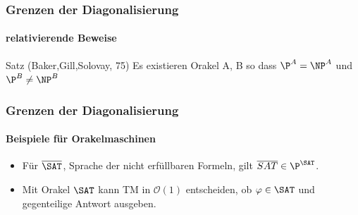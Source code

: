 \begin{frame}
	\frametitle{Grenzen der Diagonalisierung}
	\framesubtitle{relativierende Beweise}
	\begin{KITinfoblock}{Satz (Baker,Gill,Solovay, 75)}
		Es existieren Orakel A, B so dass ${\P}^A = {\NP}^A$ und ${\P}^B \neq {\NP}^B$
	\end{KITinfoblock}
	\bigskip
	\begin{overprint}
		
	\end{overprint}
\end{frame}

\begin{frame}
	\frametitle{Grenzen der Diagonalisierung}
	\framesubtitle{Beispiele für Orakelmaschinen}
	\heading{$\overline{\SAT}$}
	\begin{itemize}[<+->]
		\item   Für $\overline{\SAT}$, Sprache der nicht erfüllbaren Formeln, gilt
		$\overline{SAT} \in {\P}^{\SAT}$.
		\item   Mit  Orakel $\SAT$ kann TM in $\mathcal{O}(1)$ entscheiden, ob
		$\varphi \in \SAT$ und gegenteilige Antwort ausgeben.
	\end{itemize}
\end{frame}

